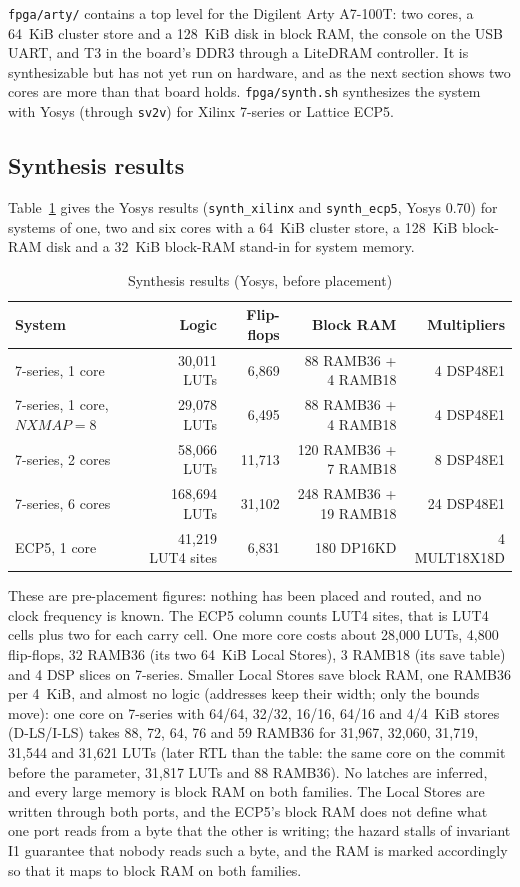 \texttt{fpga/arty/} contains a top level for the Digilent Arty A7-100T: two cores, a 64~KiB cluster
store and a 128~KiB disk in block RAM, the console on the USB UART, and T3 in the board's DDR3 through a
LiteDRAM controller. It is synthesizable but has not yet run on hardware, and as the next section shows
two cores are more than that board holds. \texttt{fpga/synth.sh}
synthesizes the system with Yosys (through \texttt{sv2v}) for Xilinx 7-series or Lattice ECP5.

\subsection{Synthesis results}

Table~\ref{tab:synth} gives the Yosys results (\texttt{synth\_xilinx} and \texttt{synth\_ecp5}, Yosys
0.70) for systems of one, two and six cores with a 64~KiB cluster store, a 128~KiB block-RAM disk and a
32~KiB block-RAM stand-in for system memory.

\begin{table}[htbp]
\centering\small
\caption{Synthesis results (Yosys, before placement)}\label{tab:synth}
\begin{tabular}{@{}l r r r r@{}}
\toprule
\textbf{System} & \textbf{Logic} & \textbf{Flip-flops} & \textbf{Block RAM} & \textbf{Multipliers}\\\midrule
7-series, 1 core & 30,011 LUTs & 6,869 & 88 RAMB36 + 4 RAMB18 & 4 DSP48E1\\
7-series, 1 core, $\textit{NXMAP} = 8$ & 29,078 LUTs & 6,495 & 88 RAMB36 + 4 RAMB18 & 4 DSP48E1\\
7-series, 2 cores & 58,066 LUTs & 11,713 & 120 RAMB36 + 7 RAMB18 & 8 DSP48E1\\
7-series, 6 cores & 168,694 LUTs & 31,102 & 248 RAMB36 + 19 RAMB18 & 24 DSP48E1\\
ECP5, 1 core & 41,219 LUT4 sites & 6,831 & 180 DP16KD & 4 MULT18X18D\\
\bottomrule
\end{tabular}
\end{table}

These are pre-placement figures: nothing has been placed and routed, and no clock frequency is known.
The ECP5 column counts LUT4 sites, that is LUT4 cells plus two for each carry cell. One more core costs
about 28,000 LUTs, 4,800 flip-flops, 32 RAMB36 (its two 64~KiB Local Stores), 3 RAMB18 (its save table)
and 4 DSP slices on 7-series. Smaller Local Stores save block RAM, one RAMB36 per 4~KiB, and almost no
logic (addresses keep their width; only the bounds move): one core on 7-series with 64/64, 32/32,
16/16, 64/16 and 4/4~KiB stores (D-LS/I-LS) takes 88, 72, 64, 76 and 59 RAMB36 for 31,967, 32,060,
31,719, 31,544 and 31,621 LUTs (later RTL than the table: the same core on the commit before the
parameter, 31,817 LUTs and 88 RAMB36). No latches are inferred, and every large memory is block RAM on both
families. The Local Stores are written through both ports, and the ECP5's block RAM does not define what
one port reads from a byte that the other is writing; the hazard stalls of invariant I1 guarantee that
nobody reads such a byte, and the RAM is marked accordingly so that it maps to block RAM on both
families.

